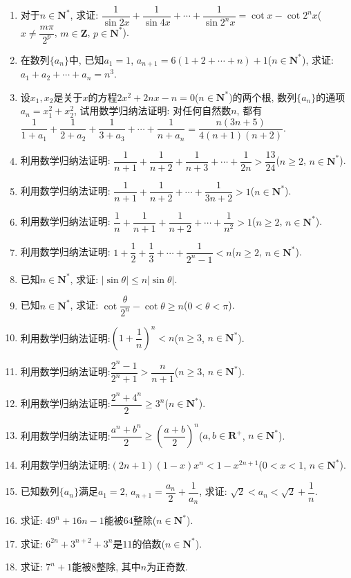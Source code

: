 \documentclass[10pt,a4paper]{article}
\begin{document}
\begin{enumerate}[1.]
\item 对于$n\in \mathbf{N}^*$, 求证: $\dfrac 1{\sin 2x}+\dfrac 1{\sin 4x}+\cdots +\dfrac 1{\sin 2^nx}=\cot x-\cot 2^nx$($x\ne \dfrac{m\pi }{2^p}$, $m\in \mathbf{Z}$, $p\in \mathbf{N}^*$).
\item 在数列$\{a_n\}$中, 已知$a_1=1$, $a_{n+1}=6(1+2+\cdots +n)+1$($n\in \mathbf{N}^*$), 求证: $a_1+a_2+\cdots +a_n=n^3$.
\item 设$x_1,x_2$是关于$x$的方程$2x^2+2nx-n=0$($n\in \mathbf{N}^*$)的两个根, 数列$\{a_n\}$的通项$a_n=x_1^2+x_2^2$, 试用数学归纳法证明: 对任何自然数$n$, 都有$\dfrac 1{1+a_1}+\dfrac 1{2+a_2}+\dfrac 1{3+a_3}+\cdots +\dfrac 1{n+a_n}=\dfrac{n(3n+5)}{4(n+1)(n+2)}$.
\item 利用数学归纳法证明: $\dfrac 1{n+1}+\dfrac 1{n+2}+\dfrac 1{n+3}+\cdots +\dfrac 1{2n}>\dfrac{13}{24}$($n\ge 2$, $n\in \mathbf{N}^*$).
\item 利用数学归纳法证明: $\dfrac 1{n+1}+\dfrac 1{n+2}+\cdots +\dfrac 1{3n+2}>1$($n\in \mathbf{N}^*$).
\item 利用数学归纳法证明: $\dfrac 1n+\dfrac 1{n+1}+\dfrac 1{n+2}+\cdots +\dfrac 1{n^2}>1$($n\ge 2$, $n\in \mathbf{N}^*$).
\item 利用数学归纳法证明: $1+\dfrac 12+\dfrac 13+\cdots +\dfrac 1{2^n-1}<n$($n\ge 2$, $n\in \mathbf{N}^*$).
\item 已知$n\in \mathbf{N}^*$, 求证: $|\sin \theta|\le n|\sin \theta|$.
\item 已知$n\in \mathbf{N}^*$, 求证: $\cot \dfrac{\theta }{2^n}-\cot \theta \ge n$($0<\theta <\pi$).
\item 利用数学归纳法证明:$(1+\dfrac 1n)^n<n$($n\ge 3$, $n\in \mathbf{N}^*$).
\item 利用数学归纳法证明:$\dfrac{{2^n}-1}{{2^n}+1}>\dfrac n{n+1}$($n\ge 3$, $n\in \mathbf{N}^*$).
\item 利用数学归纳法证明:$\dfrac{2^n+4^n}2\ge 3^n$($n\in \mathbf{N}^*$).
\item 利用数学归纳法证明:$\dfrac{a^n+b^n}2\ge (\dfrac{a+b}2)^n$($a,b\in \mathbf{R}^+$, $n\in \mathbf{N}^*$).
\item 利用数学归纳法证明:$(2n+1)(1-x)x^n<1-x^{2n+1}$($0<x<1$, $n\in \mathbf{N}^*$).
\item 已知数列$\{a_n\}$满足$a_1=2$, $a_{n+1}=\dfrac{a_n}2+\dfrac 1{a_n}$, 求证: $\sqrt 2<a_n<\sqrt 2+\dfrac 1n$.
\item 求证: $49^n+16n-1$能被$64$整除($n\in \mathbf{N}^*$).
\item 求证: $6^{2n}+3^{n+2}+3^n$是$11$的倍数($n\in \mathbf{N}^*$).
\item 求证: $7^n+1$能被$8$整除, 其中$n$为正奇数.

\end{enumerate}
\end{document}
